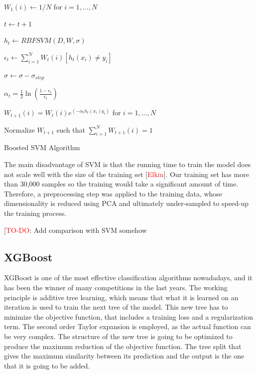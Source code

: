 \documentclass[conference]{IEEEtran}
\begin{document}
\begin{algorithm}
  
  $W_1(i) \leftarrow 1/N$ for $i=1,\dots,N$ %
  
    {
        $t \leftarrow t+1$
        
        $h_t \leftarrow RBFSVM(D,W,\sigma)$ 
        
        $\epsilon_t \leftarrow \sum^N_{i=1}W_t(i)[h_t(x_i)\neq y_i]$
        
        		{
		
		$\sigma \leftarrow \sigma - \sigma_{step}$
		
		}
	\Else
	{
	$\alpha_t = \frac{1}{2}\ln \left( \frac{1-\epsilon_t}{\epsilon_t} \right)$
	
	  
	 $W_{t+1}(i) = W_t(i) e^{(-\alpha_th_t(x_i)y_i)}$ for $i=1,\dots,N$
	 
	 Normalize $W_{t+1}$ such that $\sum^N_{i=1}W_{t+1}(i)=1$
	 }
    }
\caption{Boosted SVM Algorithm}
\end{algorithm}

The main disadvantage of SVM is that the running time to train the model does not scale well with the size of the training set [\textcolor{red}{Elkin}]. Our training set has more than 30,000 samples so the training would take a significant amount of time. Therefore, a preprocessing step was applied to the training data, whose dimensionality is reduced using PCA and ultimately under-sampled to speed-up the training process. 

[\textcolor{red}{TO-DO}: Add comparison with SVM somehow

\subsection{XGBoost}
XGBoost is one of the most effective classification algorithms nowadadays, and it has been the winner of many competitions in the last years. The working principle is additive tree learning, which means that what it is learned on an iteration is used to train the next tree of the model. This new tree has to minimize the objective function, that includes a training loss and a regularization term. The second order Taylor expansion is employed, as the actual function can be very complex. The structure of the new tree is going to be optimized to produce the maximum reduction of the objective function. The tree split that gives the maximum similarity between its prediction and the output is the one that it is going to be added. 
\end{document}
